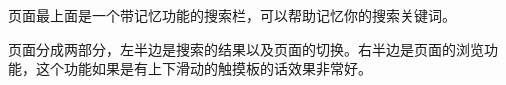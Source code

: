 \documentclass[11pt, a4paper]{article}
\makeatletter
\newcommand\fcaption{\def\@captype{figure}\caption}
\newcommand\tcaption{\def\@captype{table}\caption}
\makeatother
\begin{document}
页面最上面是一个带记忆功能的搜索栏，可以帮助记忆你的搜索关键词。

页面分成两部分，左半边是搜索的结果以及页面的切换。右半边是页面的浏览功能，这个功能如果是有上下滑动的触摸板的话效果非常好。




\end{document}
